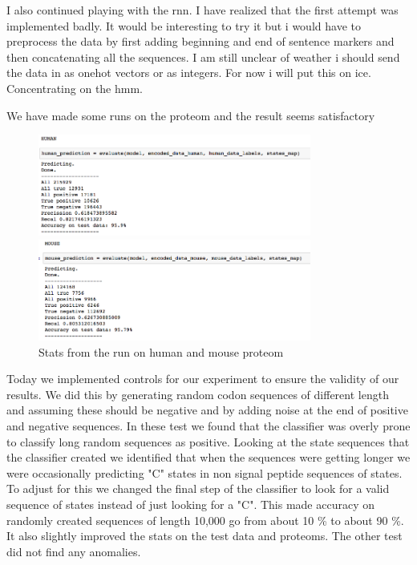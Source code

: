 \documentclass[a4paper]{tufte-handout}
\begin{document}
I also continued playing with the rnn. I have realized that the first attempt was implemented badly.
It would be interesting to try it but i would have to preprocess the data by first adding beginning and end of sentence markers and then concatenating all the sequences. I am still unclear of weather i should send the data in as onehot vectors or as integers. For now i will put this on ice. Concentrating on the hmm.

We have made some runs on the proteom and the result seems satisfactory

\begin{figure}
    \begin{center}
      \includegraphics[width=0.8\textwidth]{pics/human_hmm_run.png}
    \end{center}
    \caption{Stats from the run on human and mouse proteom}

    \begin{center}
      \includegraphics[width=0.8\textwidth]{pics/mouse_hmm_run.png}
    \end{center}
\end{figure}
Today we implemented controls for our experiment to ensure the validity of our results. We did this by generating random codon sequences of different length and assuming these should be negative and by adding noise at the end of positive and negative sequences. In these test we found that the classifier was overly prone to classify long random sequences as positive. Looking at the state sequences that the classifier created we identified that when the sequences were getting longer we were occasionally predicting "C" states in non signal peptide sequences of states. To adjust for this we changed the final step of the classifier to look for a valid sequence of states instead of just looking for a "C". This made accuracy on randomly created sequences of length 10,000 go from about 10 \% to about 90 \%. It also slightly improved the stats on the test data and proteoms. The other test did not find any anomalies.

\hrulefill



\end{document}
